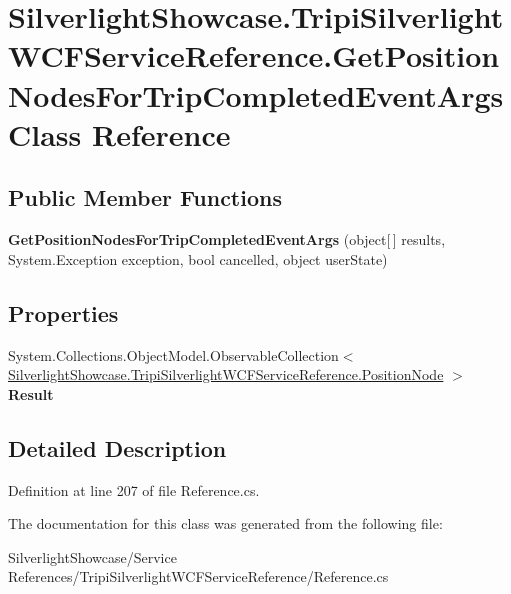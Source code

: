 \hypertarget{class_silverlight_showcase_1_1_tripi_silverlight_w_c_f_service_reference_1_1_get_position_nodes_for_trip_completed_event_args}{
\section{SilverlightShowcase.TripiSilverlightWCFServiceReference.GetPositionNodesForTripCompletedEventArgs Class Reference}
\label{class_silverlight_showcase_1_1_tripi_silverlight_w_c_f_service_reference_1_1_get_position_nodes_for_trip_completed_event_args}
}
\subsection*{Public Member Functions}
\begin{DoxyCompactItemize}
\item 
\hypertarget{class_silverlight_showcase_1_1_tripi_silverlight_w_c_f_service_reference_1_1_get_position_nodes_for_trip_completed_event_args_aef71681b29fd7eb82f57ee90d920d274}{
{\bfseries GetPositionNodesForTripCompletedEventArgs} (object\mbox{[}$\,$\mbox{]} results, System.Exception exception, bool cancelled, object userState)}
\label{class_silverlight_showcase_1_1_tripi_silverlight_w_c_f_service_reference_1_1_get_position_nodes_for_trip_completed_event_args_aef71681b29fd7eb82f57ee90d920d274}

\end{DoxyCompactItemize}
\subsection*{Properties}
\begin{DoxyCompactItemize}
\item 
\hypertarget{class_silverlight_showcase_1_1_tripi_silverlight_w_c_f_service_reference_1_1_get_position_nodes_for_trip_completed_event_args_a9979440829ae0d8acc0cd17a10106800}{
System.Collections.ObjectModel.ObservableCollection$<$ \hyperlink{class_silverlight_showcase_1_1_tripi_silverlight_w_c_f_service_reference_1_1_position_node}{SilverlightShowcase.TripiSilverlightWCFServiceReference.PositionNode} $>$ {\bfseries Result}}
\label{class_silverlight_showcase_1_1_tripi_silverlight_w_c_f_service_reference_1_1_get_position_nodes_for_trip_completed_event_args_a9979440829ae0d8acc0cd17a10106800}

\end{DoxyCompactItemize}


\subsection{Detailed Description}


Definition at line 207 of file Reference.cs.

The documentation for this class was generated from the following file:\begin{DoxyCompactItemize}
\item 
SilverlightShowcase/Service References/TripiSilverlightWCFServiceReference/Reference.cs\end{DoxyCompactItemize}
